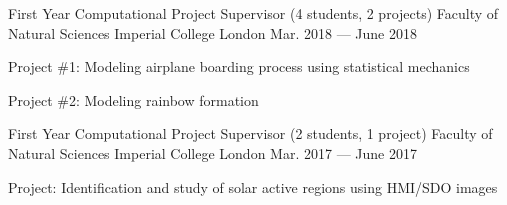 
\begin{cventries}

  \cventry
    {First Year Computational Project Supervisor (4 students, 2 projects)} %
    {Faculty of Natural Sciences} %
    {Imperial College London} %
    {Mar. 2018 --- June 2018} %
    {
      \begin{cvitems} %
        \item {Project \#1: Modeling airplane boarding process using statistical mechanics}
        \item {Project \#2: Modeling rainbow formation}
      \end{cvitems}
    }

  \cventry
    {First Year Computational Project Supervisor (2 students, 1 project)} %
    {Faculty of Natural Sciences} %
    {Imperial College London} %
    {Mar. 2017 --- June 2017} %
    {
      \begin{cvitems} %
        \item {Project: Identification and study of solar active regions using HMI/SDO images}
      \end{cvitems}
    }


\end{cventries}
